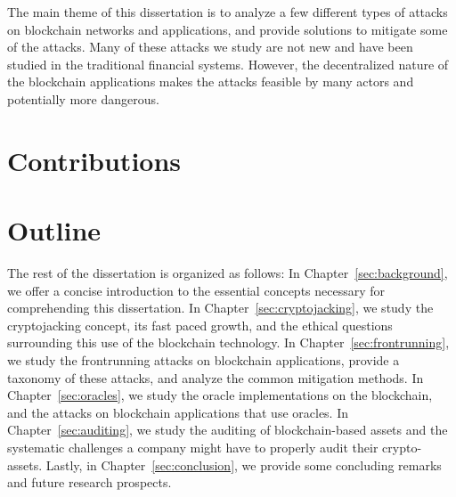 The main theme of this dissertation is to analyze a few different types of attacks on blockchain networks and applications, and provide solutions to mitigate some of the attacks. Many of these attacks we study are not new and have been studied in the traditional financial systems. However, the decentralized nature of the blockchain applications makes the attacks feasible by many actors and potentially more dangerous. 



\section{Contributions} %







\section{Outline}
The rest of the dissertation is organized as follows: In Chapter~\ref{sec:background}, we offer a concise introduction to the essential concepts necessary for comprehending this dissertation. In Chapter~\ref{sec:cryptojacking}, we study the cryptojacking concept, its fast paced growth, and the ethical questions surrounding this use of the blockchain technology. In Chapter~\ref{sec:frontrunning}, we study the frontrunning attacks on blockchain applications, provide a taxonomy of these attacks, and analyze the common mitigation methods. In Chapter~\ref{sec:oracles}, we study the oracle implementations on the blockchain, and the attacks on blockchain applications that use oracles. In Chapter~\ref{sec:auditing}, we study the auditing of blockchain-based assets and the systematic challenges a company might have to properly audit their crypto-assets. Lastly, in Chapter~\ref{sec:conclusion}, we provide some concluding remarks and future research prospects.